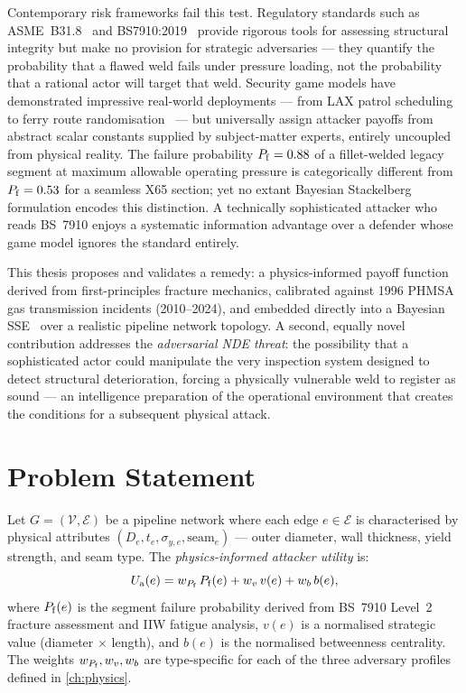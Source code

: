 Contemporary risk frameworks fail this test.  Regulatory standards such
as \ac{ASME}~B31.8~\cite{ASME_B31_8:2025} and \ac{BS7910}:2019~\cite{BS7910:2019}
provide rigorous tools for assessing structural integrity but make no
provision for strategic adversaries — they quantify the probability that
a flawed weld fails under pressure loading, not the probability that a
rational actor will target that weld.  Security game models have
demonstrated impressive real-world deployments — from \ac{LAX} patrol
scheduling~\cite{An2013} to ferry route randomisation~\cite{Tambe2011} —
but universally assign attacker payoffs from abstract scalar constants
supplied by subject-matter experts, entirely uncoupled from physical
reality.  The failure probability $P_{\mathrm{f}} = 0.88$ of a fillet-welded
legacy segment at maximum allowable operating pressure is categorically
different from $P_{\mathrm{f}} = 0.53$ for a seamless X65 section; yet no extant
Bayesian Stackelberg formulation encodes this distinction.  A technically
sophisticated attacker who reads BS~7910 enjoys a systematic information
advantage over a defender whose game model ignores the standard entirely.

This thesis proposes and validates a remedy: a physics-informed payoff
function derived from first-principles fracture mechanics, calibrated against
\num{1996} \ac{PHMSA} gas transmission incidents (2010--2024), and embedded
directly into a Bayesian \ac{SSE}~\cite{Paruchuri2008} over a realistic
pipeline network topology.  A second, equally novel contribution addresses
the \emph{adversarial NDE threat}: the possibility that a sophisticated
actor could manipulate the very inspection system designed to detect
structural deterioration, forcing a physically vulnerable weld to register
as sound — an intelligence preparation of the operational environment that
creates the conditions for a subsequent physical attack.

\section{Problem Statement}
\label{sec:intro_problem}

Let $G = (\mathcal{V}, \mathcal{E})$ be a pipeline network where each
edge $e \in \mathcal{E}$ is characterised by physical attributes
$(D_e, t_e, \sigma_{y,e}, \text{seam}_e)$ — outer diameter, wall
thickness, yield strength, and seam type.  The \emph{physics-informed
attacker utility} is:
\begin{equation}
  U_{\mathrm{a}}(e) = w_{P_{\mathrm{f}}}\,P_{\mathrm{f}}(e) + w_v\,v(e) + w_b\,b(e),
  \label{eq:attacker_utility}
\end{equation}
where $P_{\mathrm{f}}(e)$ is the segment failure probability derived from BS~7910
Level~2 fracture assessment and \acs{IIW} fatigue analysis,
$v(e)$ is a normalised strategic value (diameter $\times$ length), and
$b(e)$ is the normalised betweenness centrality.  The weights
$w_{P_{\mathrm{f}}}, w_v, w_b$ are type-specific for each of the three adversary
profiles defined in \cref{ch:physics}.

